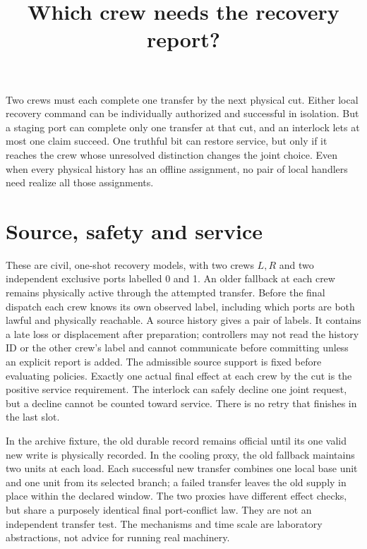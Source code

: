 \documentclass[11pt]{article}
\title{Which crew needs the recovery report?}
\date{}
\begin{document}
\maketitle

Two crews must each complete one transfer by the next physical cut.
Either local recovery command can be individually authorized and
successful in isolation. But a staging port can complete only one
transfer at that cut, and an interlock lets at most one claim succeed.
One truthful bit can restore service, but only if it reaches the crew
whose unresolved distinction changes the joint choice. Even when every
physical history has an offline assignment, no pair of local handlers
need realize all those assignments.

\section{Source, safety and service}
These are civil, one-shot recovery models, with two crews \(L,R\) and
two independent exclusive ports labelled 0 and 1. An older fallback
at each crew remains physically active through the attempted transfer.
Before the final dispatch each crew knows its own observed label,
including which ports are both lawful and physically reachable. A
source history gives a pair of labels. It contains a late loss or
displacement after preparation; controllers may not read the history
ID or the other crew's label and cannot communicate before committing
unless an explicit report is added. The admissible source support
is fixed before evaluating policies. Exactly one actual final effect
at each crew by the cut is the positive service requirement. The
interlock can safely decline one joint request, but a decline cannot
be counted toward service. There is no retry that finishes in the
last slot.

In the archive fixture, the old durable record remains official
until its one valid new write is physically recorded. In the
cooling proxy, the old fallback maintains two units at each load.
Each successful new transfer combines one local base unit and one
unit from its selected branch; a failed transfer leaves the old
supply in place within the declared window. The two proxies have
different effect checks, but share a purposely identical final
port-conflict law. They are not an independent transfer test. The
mechanisms and time scale are laboratory abstractions, not advice
for running real machinery.
\end{document}
